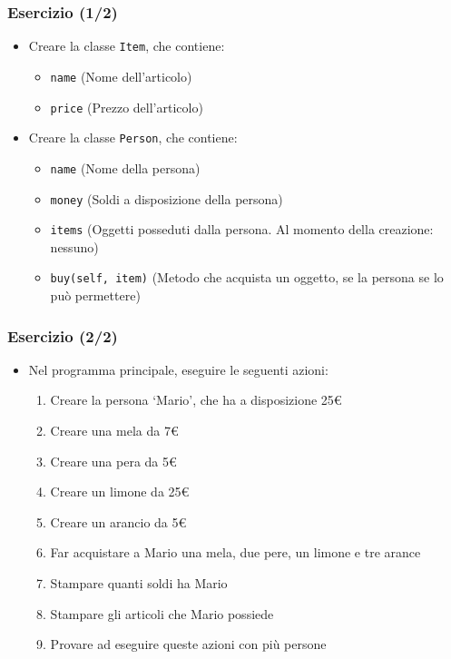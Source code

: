 \begin{exerciseframe}
    \frametitle{Esercizio (1/2)}

    \begin{itemize}
        \item Creare la classe \texttt{Item}, che contiene:
        \begin{itemize}
            \item \texttt{name} (Nome dell'articolo)
            \item \texttt{price} (Prezzo dell'articolo)
        \end{itemize}

        \bigskip
        \item Creare la classe \texttt{Person}, che contiene:
        \begin{itemize}
            \item \texttt{name} (Nome della persona)
            \item \texttt{money} (Soldi a disposizione della persona)
            \item \texttt{items} (Oggetti posseduti dalla persona. Al momento della creazione: nessuno)
            \item \texttt{buy(self, item)} (Metodo che acquista un oggetto, se la persona se lo può permettere)
        \end{itemize}
    \end{itemize}
\end{exerciseframe}

\begin{exerciseframe}
    \frametitle{Esercizio (2/2)}

    \begin{itemize}
        \item Nel programma principale, eseguire le seguenti azioni:
        \begin{enumerate}
            \item Creare la persona `Mario', che ha a disposizione 25€
            \item Creare una mela da 7€
            \item Creare una pera da 5€
            \item Creare un limone da 25€
            \item Creare un arancio da 5€
            \item Far acquistare a Mario una mela, due pere, un limone e tre arance
            \item Stampare quanti soldi ha Mario
            \item Stampare gli articoli che Mario possiede
            \pause
            \bigskip
            \item Provare ad eseguire queste azioni con più persone
        \end{enumerate}
    \end{itemize}
\end{exerciseframe}